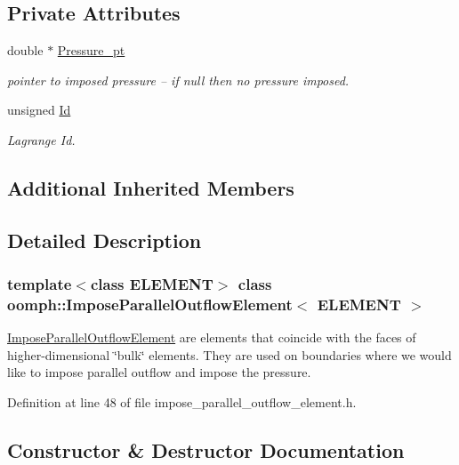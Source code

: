 \subsection*{Private Attributes}
\begin{DoxyCompactItemize}
\item 
double $\ast$ \hyperlink{classoomph_1_1ImposeParallelOutflowElement_a94eb742690d8173e99d482a8f2426729}{Pressure\+\_\+pt}
\begin{DoxyCompactList}\small\item\em pointer to imposed pressure -- if null then no pressure imposed. \end{DoxyCompactList}\item 
unsigned \hyperlink{classoomph_1_1ImposeParallelOutflowElement_a8eae8247a1a373ea998eda8b5d409c02}{Id}
\begin{DoxyCompactList}\small\item\em Lagrange Id. \end{DoxyCompactList}\end{DoxyCompactItemize}
\subsection*{Additional Inherited Members}


\subsection{Detailed Description}
\subsubsection*{template$<$class E\+L\+E\+M\+E\+NT$>$\newline
class oomph\+::\+Impose\+Parallel\+Outflow\+Element$<$ E\+L\+E\+M\+E\+N\+T $>$}

\hyperlink{classoomph_1_1ImposeParallelOutflowElement}{Impose\+Parallel\+Outflow\+Element} are elements that coincide with the faces of higher-\/dimensional \char`\"{}bulk\char`\"{} elements. They are used on boundaries where we would like to impose parallel outflow and impose the pressure. 

Definition at line 48 of file impose\+\_\+parallel\+\_\+outflow\+\_\+element.\+h.



\subsection{Constructor \& Destructor Documentation}
\mbox{\label{classoomph_1_1ImposeParallelOutflowElement_ace1712cccb1e4b43ccf13d0dcfefee86}} 

